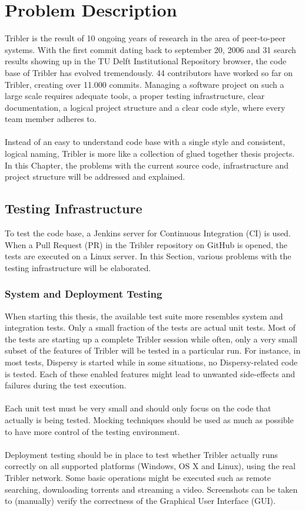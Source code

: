 \chapter{Problem Description}

Tribler is the result of 10 ongoing years of research in the area of peer-to-peer systems. With the first commit dating back to september 20, 2006 and 31 search results showing up in the TU Delft Institutional Repository browser, the code base of Tribler has evolved tremendously. 44 contributors have worked so far on Tribler, creating over 11.000 commits. Managing a software project on such a large scale requires adequate tools, a proper testing infrastructure, clear documentation, a logical project structure and a clear code style, where every team member adheres to.\\\\
Instead of an easy to understand code base with a single style and consistent, logical naming, Tribler is more like a collection of glued together thesis projects. In this Chapter, the problems with the current source code, infrastructure and project structure will be addressed and explained.

\section{Testing Infrastructure}
To test the code base, a Jenkins server for Continuous Integration (CI) is used. When a Pull Request (PR) in the Tribler repository on GitHub is opened, the tests are executed on a Linux server. In this Section, various problems with the testing infrastructure will be elaborated.

\subsection{System and Deployment Testing}
When starting this thesis, the available test suite more resembles system and integration tests. Only a small fraction of the tests are actual unit tests. Most of the tests are starting up a complete Tribler session while often, only a very small subset of the features of Tribler will be tested in a particular run. For instance, in most tests, Dispersy is started while in some situations, no Dispersy-related code is tested. Each of these enabled features might lead to unwanted side-effects and failures during the test execution.\\\\
Each unit test must be very small and should only focus on the code that actually is being tested. Mocking techniques should be used as much as possible to have more control of the testing environment.\\\\
Deployment testing should be in place to test whether Tribler actually runs correctly on all supported platforms (Windows, OS X and Linux), using the real Tribler network. Some basic operations might be executed such as remote searching, downloading torrents and streaming a video. Screenshots can be taken to (manually) verify the correctness of the Graphical User Interface (GUI).

